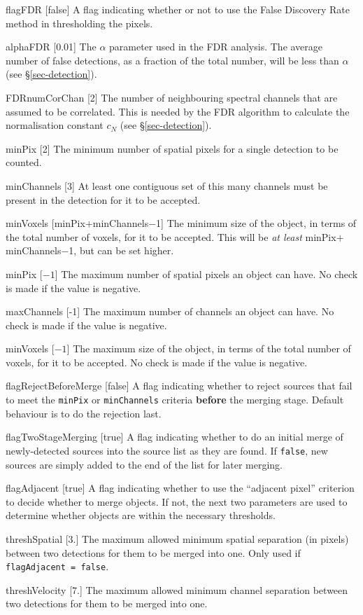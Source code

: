 \begin{Lentry}
\item[{flagFDR [false]}] A flag indicating whether or not to use
  the False Discovery Rate method in thresholding the pixels.
\item[{alphaFDR [0.01]}] The $\alpha$ parameter used in the FDR
  analysis. The average number of false detections, as a fraction of
  the total number, will be less than $\alpha$ (see
  \S\ref{sec-detection}).
\item[{FDRnumCorChan [2]}] The number of neighbouring spectral
  channels that are assumed to be correlated. This is needed by the
  FDR algorithm to calculate the normalisation constant $c_N$ (see
  \S\ref{sec-detection}). 
\end{Lentry}

\begin{Lentry}
\item[{minPix [2]}] The minimum number of spatial pixels for a
  single detection to be counted.
\item[{minChannels [3]}] At least one contiguous set of this many
  channels must be present in the detection for it to be accepted.
\item[{minVoxels [minPix$+$minChannels$-$1]}] The minimum size of
  the object, in terms of the total number of voxels, for it to be
  accepted. This will be \textit{at least} minPix$+$minChannels$-$1,
  but can be set higher.
\item[{minPix [$-1$]}] The maximum number of spatial pixels an object
  can have. No check is made if the value is negative.
\item[{maxChannels [-1]}] The maximum number of channels an object can
  have. No check is made if the value is negative.
\item[{minVoxels [$-1$]}] The maximum size of
  the object, in terms of the total number of voxels, for it to be
  accepted. No check is made if the value is negative.
\item[{flagRejectBeforeMerge [false]}] A flag indicating whether to
  reject sources that fail to meet the \texttt{minPix} or
  \texttt{minChannels} criteria \textbf{before} the merging
  stage. Default behaviour is to do the rejection last.
\item[{flagTwoStageMerging [true]}] A flag indicating whether to do an
  initial merge of newly-detected sources into the source list as they
  are found. If \texttt{false}, new sources are simply added to the
  end of the list for later merging.
\item[{flagAdjacent [true]}] A flag indicating whether to use
  the ``adjacent pixel'' criterion to decide whether to merge
  objects. If not, the next two parameters are used to determine
  whether objects are within the necessary thresholds.
\item[{threshSpatial [3.]}] The maximum allowed minimum spatial
  separation (in pixels) between two detections for them to be merged
  into one. Only used if \texttt{flagAdjacent = false}.
\item[{threshVelocity [7.]}] The maximum allowed minimum channel
  separation between two detections for them to be merged into
  one. 
\end{Lentry}

